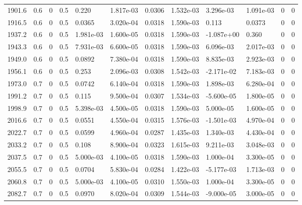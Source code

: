 \documentclass[preview]{standalone}
\begin{document}
{{{{{\begin{tabular}{L{1.2cm}C{1.2cm} C{0.3cm}C{0.5cm} C{1.4cm}C{1.4cm} C{1.4cm}C{1.4cm} C{1.6cm}C{1.6cm} C{1.6cm}C{1.6cm}}
  1901.6  &   0.6  & 0     & 0.5 &  0.220  & 1.817e-03  &  0.0306&   1.532e-03& 3.296e-03 & 1.091e-03   &  0 & 0  \\ 
  1916.5  &   0.6  & 0     & 0.5 &  0.0365  & 3.020e-04  &  0.0318&   1.590e-03& 0.113 & 0.0373   &  0 & 0  \\ 
  1937.2  &   0.6  & 0     & 0.5 &  1.981e-03  & 1.600e-05  &  0.0318&   1.590e-03& -1.087e+00 & 0.360   &  0 & 0  \\ 
  1943.3  &   0.6  & 0     & 0.5 &  7.931e-03  & 6.600e-05  &  0.0318&   1.590e-03& 6.096e-03 & 2.017e-03   &  0 & 0  \\ 
  1949.0  &   0.6  & 0     & 0.5 &  0.0892  & 7.380e-04  &  0.0318&   1.590e-03& 8.835e-03 & 2.923e-03   &  0 & 0  \\ 
  1956.1  &   0.6  & 0     & 0.5 &  0.253  & 2.096e-03  &  0.0308&   1.542e-03& -2.171e-02 & 7.183e-03   &  0 & 0  \\ 
  1973.0  &   0.7  & 0     & 0.5 &  0.0742  & 6.140e-04  &  0.0318&   1.590e-03& 1.898e-03 & 6.280e-04   &  0 & 0  \\ 
  1991.2  &   0.7  & 0     & 0.5 &  0.115  & 9.500e-04  &  0.0307&   1.534e-03& -5.600e-05 & 1.800e-05   &  0 & 0  \\ 
  1998.9  &   0.7  & 0     & 0.5 &  5.398e-03  & 4.500e-05  &  0.0318&   1.590e-03& 5.000e-05 & 1.600e-05   &  0 & 0  \\ 
  2016.6  &   0.7  & 0     & 0.5 &  0.0551  & 4.550e-04  &  0.0315&   1.576e-03& -1.501e-03 & 4.970e-04   &  0 & 0  \\ 
  2022.7  &   0.7  & 0     & 0.5 &  0.0599  & 4.960e-04  &  0.0287&   1.435e-03& 1.340e-03 & 4.430e-04   &  0 & 0  \\ 
  2033.2  &   0.7  & 0     & 0.5 &  0.108  & 8.900e-04  &  0.0323&   1.615e-03& 9.211e-03 & 3.048e-03   &  0 & 0  \\ 
  2037.5  &   0.7  & 0     & 0.5 &  5.000e-03  & 4.100e-05  &  0.0318&   1.590e-03& 1.000e-04 & 3.300e-05   &  0 & 0  \\ 
  2055.5  &   0.7  & 0     & 0.5 &  0.0704  & 5.830e-04  &  0.0284&   1.422e-03& -5.177e-03 & 1.713e-03   &  0 & 0  \\ 
  2060.8  &   0.7  & 0     & 0.5 &  5.000e-03  & 4.100e-05  &  0.0310&   1.550e-03& 1.000e-04 & 3.300e-05   &  0 & 0  \\ 
  2082.7  &   0.7  & 0     & 0.5 &  0.0970  & 8.020e-04  &  0.0309&   1.544e-03& -9.000e-05 & 3.000e-05   &  0 & 0  \\ 
\hline 
\end{tabular} 

}}}}}
\end{document}
